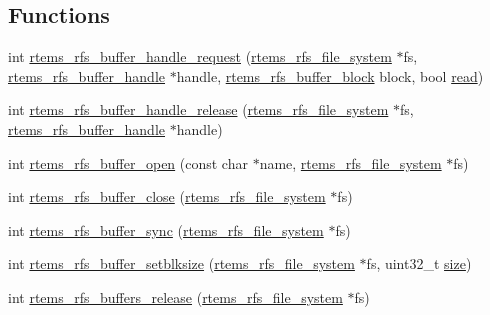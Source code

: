 \subsection*{Functions}
\begin{DoxyCompactItemize}
\item 
int \mbox{\hyperlink{rtems-rfs-buffer_8c_a0663516c5bc4844f8b6f47ebb9705dea}{rtems\+\_\+rfs\+\_\+buffer\+\_\+handle\+\_\+request}} (\mbox{\hyperlink{struct__rtems__rfs__file__system}{rtems\+\_\+rfs\+\_\+file\+\_\+system}} $\ast$fs, \mbox{\hyperlink{rtems-rfs-buffer_8h_a17f97c37c5273ad28d413dfd2d175e23}{rtems\+\_\+rfs\+\_\+buffer\+\_\+handle}} $\ast$handle, \mbox{\hyperlink{rtems-rfs-buffer_8h_a5650d53328a5af0a78198fe780aec043}{rtems\+\_\+rfs\+\_\+buffer\+\_\+block}} block, bool \mbox{\hyperlink{libcsupport_2src_2read_8c_a26d4711c05afec4c7771c3d17b2db9e9}{read}})
\item 
int \mbox{\hyperlink{rtems-rfs-buffer_8c_ab50227fce5883f922c86d14e0e558270}{rtems\+\_\+rfs\+\_\+buffer\+\_\+handle\+\_\+release}} (\mbox{\hyperlink{struct__rtems__rfs__file__system}{rtems\+\_\+rfs\+\_\+file\+\_\+system}} $\ast$fs, \mbox{\hyperlink{rtems-rfs-buffer_8h_a17f97c37c5273ad28d413dfd2d175e23}{rtems\+\_\+rfs\+\_\+buffer\+\_\+handle}} $\ast$handle)
\item 
int \mbox{\hyperlink{rtems-rfs-buffer_8c_af8b9acf77d20824a7121b89ab7b29bf9}{rtems\+\_\+rfs\+\_\+buffer\+\_\+open}} (const char $\ast$name, \mbox{\hyperlink{struct__rtems__rfs__file__system}{rtems\+\_\+rfs\+\_\+file\+\_\+system}} $\ast$fs)
\item 
int \mbox{\hyperlink{rtems-rfs-buffer_8c_ae5b347848c87353252dde82820821b05}{rtems\+\_\+rfs\+\_\+buffer\+\_\+close}} (\mbox{\hyperlink{struct__rtems__rfs__file__system}{rtems\+\_\+rfs\+\_\+file\+\_\+system}} $\ast$fs)
\item 
int \mbox{\hyperlink{rtems-rfs-buffer_8c_ae563bb0d8d88241eba145f94ab3056f7}{rtems\+\_\+rfs\+\_\+buffer\+\_\+sync}} (\mbox{\hyperlink{struct__rtems__rfs__file__system}{rtems\+\_\+rfs\+\_\+file\+\_\+system}} $\ast$fs)
\item 
int \mbox{\hyperlink{rtems-rfs-buffer_8c_ab9a25f519ce861f9781f99faee5c903e}{rtems\+\_\+rfs\+\_\+buffer\+\_\+setblksize}} (\mbox{\hyperlink{struct__rtems__rfs__file__system}{rtems\+\_\+rfs\+\_\+file\+\_\+system}} $\ast$fs, uint32\+\_\+t \mbox{\hyperlink{sun4u_2tte_8h_a245260f6f74972558f61b85227df5aae}{size}})
\item 
int \mbox{\hyperlink{rtems-rfs-buffer_8c_a26b599aacf6e9230ab77cf47d9fad0d9}{rtems\+\_\+rfs\+\_\+buffers\+\_\+release}} (\mbox{\hyperlink{struct__rtems__rfs__file__system}{rtems\+\_\+rfs\+\_\+file\+\_\+system}} $\ast$fs)
\end{DoxyCompactItemize}


